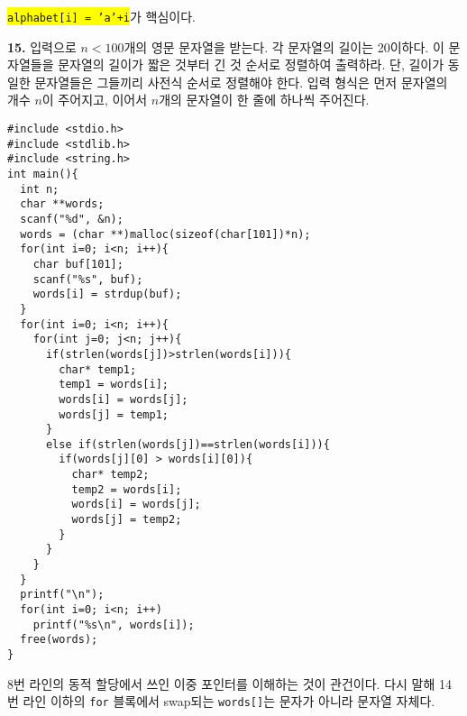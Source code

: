\documentclass[a4paper,chapter,atbegshi]{oblivoir}
\begin{document}
\colorbox{yellow}{\texttt{alphabet[i] = 'a'+i}}가 핵심이다.
\hfill\break
\begin{mdframed}\textbf{15. }
  입력으로 $n<100$개의 영문 문자열을 받는다. 각 문자열의 길이는 20이하다. 이
  문자열들을 문자열의 길이가 짧은 것부터 긴 것 순서로 정렬하여 출력하라. 단,
  길이가 동일한 문자열들은 그들끼리 사전식 순서로 정렬해야 한다. 입력 형식은
  먼저 문자열의 개수 $n$이 주어지고, 이어서 $n$개의 문자열이 한 줄에 하나씩
  주어진다. 
\end{mdframed}
\begin{lstlisting}[style=C]
#include <stdio.h>
#include <stdlib.h>
#include <string.h>
int main(){
  int n;
  char **words;
  scanf("%d", &n);
  words = (char **)malloc(sizeof(char[101])*n);
  for(int i=0; i<n; i++){
    char buf[101];
    scanf("%s", buf);
    words[i] = strdup(buf);
  }
  for(int i=0; i<n; i++){
    for(int j=0; j<n; j++){
      if(strlen(words[j])>strlen(words[i])){
        char* temp1;
        temp1 = words[i];
        words[i] = words[j];
        words[j] = temp1;
      }
      else if(strlen(words[j])==strlen(words[i])){
        if(words[j][0] > words[i][0]){
          char* temp2;
          temp2 = words[i];
          words[i] = words[j];
          words[j] = temp2;
        }
      }
    }
  }
  printf("\n");
  for(int i=0; i<n; i++)
    printf("%s\n", words[i]);
  free(words);
}
\end{lstlisting}
8번 라인의 동적 할당에서 쓰인 이중 포인터를 이해하는 것이 관건이다. 다시 말해
14번 라인 이하의 \texttt{for} 블록에서 swap되는 \texttt{words[]}는 문자가 아니라
문자열 자체다.
\end{document}
